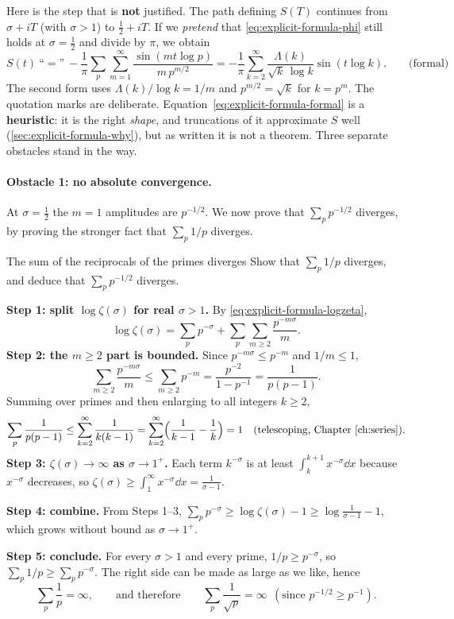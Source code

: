 Here is the step that is \textbf{not} justified. The path defining $S(T)$ continues from $\sigma+iT$ (with $\sigma>1$) to $\tfrac12+iT$. If we \emph{pretend} that \cref{eq:explicit-formula-phi} still holds at $\sigma=\tfrac12$ and divide by $\pi$, we obtain
\begin{equation}
S(t)\ \text{``}{=}\text{''}\ -\frac{1}{\pi}\sum_p\sum_{m=1}^{\infty}\frac{\sin(mt\log p)}{m\,p^{m/2}}
=-\frac1\pi\sum_{k=2}^{\infty}\frac{\Lambda(k)}{\sqrt{k}\,\log k}\sin(t\log k).
\qquad\text{(formal)}
\label{eq:explicit-formula-formal}
\end{equation}
The second form uses $\Lambda(k)/\log k=1/m$ and $p^{m/2}=\sqrt{k}$ for $k=p^m$. The quotation marks are deliberate. Equation~\eqref{eq:explicit-formula-formal} is a \textbf{heuristic}: it is the right \emph{shape}, and truncations of it approximate $S$ well (\cref{sec:explicit-formula-why}), but as written it is not a theorem. Three separate obstacles stand in the way.

\paragraph{Obstacle 1: no absolute convergence.} At $\sigma=\tfrac12$ the $m=1$ amplitudes are $p^{-1/2}$. We now prove that $\sum_p p^{-1/2}$ diverges, by proving the stronger fact that $\sum_p 1/p$ diverges.

\begin{sample}{The sum of the reciprocals of the primes diverges}
Show that $\sum_p 1/p$ diverges, and deduce that $\sum_p p^{-1/2}$ diverges.

\textbf{Step 1: split $\log\zeta(\sigma)$ for real $\sigma>1$.} By \cref{eq:explicit-formula-logzeta},
\[
\log\zeta(\sigma)=\sum_p p^{-\sigma}+\sum_p\sum_{m\ge2}\frac{p^{-m\sigma}}{m}.
\]
\textbf{Step 2: the $m\ge2$ part is bounded.} Since $p^{-m\sigma}\le p^{-m}$ and $1/m\le1$,
\[
\sum_{m\ge2}\frac{p^{-m\sigma}}{m}\le\sum_{m\ge2}p^{-m}=\frac{p^{-2}}{1-p^{-1}}=\frac{1}{p(p-1)} .
\]
Summing over primes and then enlarging to all integers $k\ge2$,
\[
\sum_p\frac{1}{p(p-1)}\le\sum_{k=2}^{\infty}\frac{1}{k(k-1)}=\sum_{k=2}^{\infty}\Bigl(\frac{1}{k-1}-\frac1k\Bigr)=1\quad\text{(telescoping, Chapter~\ref{ch:series})}.
\]
\textbf{Step 3: $\zeta(\sigma)\to\infty$ as $\sigma\to1^+$.} Each term $k^{-\sigma}$ is at least $\int_k^{k+1}x^{-\sigma}\dd x$ because $x^{-\sigma}$ decreases, so $\zeta(\sigma)\ge\int_1^\infty x^{-\sigma}\dd x=\frac{1}{\sigma-1}$.

\textbf{Step 4: combine.} From Steps 1--3, $\sum_p p^{-\sigma}\ge\log\zeta(\sigma)-1\ge\log\frac{1}{\sigma-1}-1$, which grows without bound as $\sigma\to1^+$.

\textbf{Step 5: conclude.} For every $\sigma>1$ and every prime, $1/p\ge p^{-\sigma}$, so $\sum_p 1/p\ge\sum_p p^{-\sigma}$. The right side can be made as large as we like, hence
\[
\boxed{\sum_p\frac1p=\infty,\qquad\text{and therefore}\qquad\sum_p\frac{1}{\sqrt p}=\infty\ \ (\text{since }p^{-1/2}\ge p^{-1}).}
\]
\end{sample}


